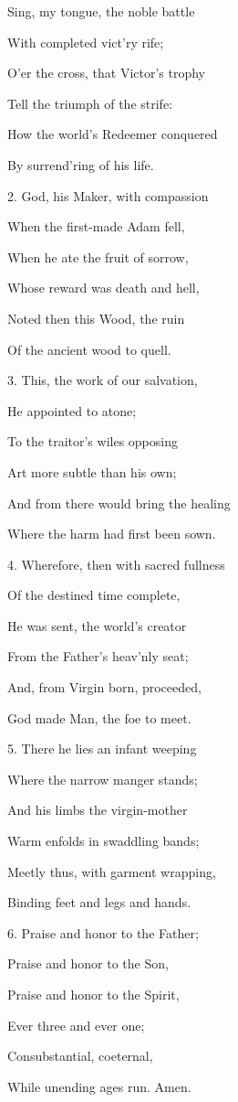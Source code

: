 Sing, my tongue, the noble battle

\noindent With completed vict'ry rife;

\noindent O'er the cross, that Victor's trophy

\noindent Tell the triumph of the strife:

\noindent How the world's Redeemer conquered

\noindent By surrend'ring of his life.

\noindent 

2. God, his Maker, with compassion

\noindent When the first-made Adam fell,

\noindent When he ate the fruit of sorrow,

\noindent Whose reward was death and hell,

\noindent Noted then this Wood, the ruin

\noindent Of the ancient wood to quell.

\noindent 

3. This, the work of our salvation,

\noindent He appointed to atone;

\noindent To the traitor's wiles opposing

\noindent Art more subtle than his own;

\noindent And from there would bring the healing

\noindent Where the harm had first been sown.

\noindent 

4. Wherefore, then with sacred fullness

\noindent Of the destined time complete,

\noindent He was sent, the world's creator

\noindent From the Father's heav'nly seat;

\noindent And, from Virgin born, proceeded,

\noindent God made Man, the foe to meet.

\noindent 

5. There he lies an infant weeping

\noindent Where the narrow manger stands;

\noindent And his limbs the virgin-mother

\noindent Warm enfolds in swaddling bands;

\noindent Meetly thus, with garment wrapping,

\noindent Binding feet and legs and hands.

\noindent 

6. Praise and honor to the Father;

\noindent Praise and honor to the Son,

\noindent Praise and honor to the Spirit,

\noindent Ever three and ever one;

\noindent Consubstantial, coeternal,

\noindent While unending ages run. Amen.

